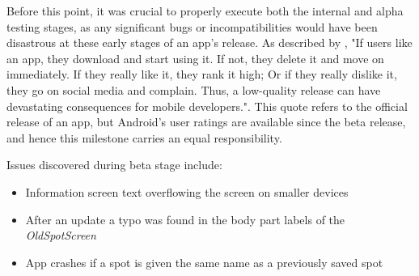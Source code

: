 Before this point, it was crucial to properly execute both the internal and alpha testing stages, as any significant bugs or incompatibilities would have been disastrous at these early stages of an app's release. As described by \cite{joorabchi2013real}, "If users like an app, they download and start using it. If not, they delete it and move on immediately. If they really like it, they rank it high; Or if they really dislike it, they go on social media and complain. Thus, a low-quality release can have devastating consequences for mobile developers.". This quote refers to the official release of an app, but Android's user ratings are available since the beta release, and hence this milestone carries an equal responsibility.

Issues discovered during beta stage include:
\begin{itemize}
    \item Information screen text overflowing the screen on smaller devices
    \item After an update a typo was found in the body part labels of the \emph{OldSpotScreen}
    \item App crashes if a spot is given the same name as a previously saved spot
\end{itemize}

